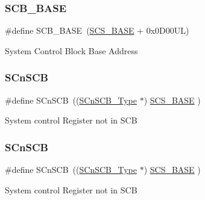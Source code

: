 \subsubsection{\texorpdfstring{S\+C\+B\+\_\+\+B\+A\+SE}{SCB\_BASE}\hspace{0.1cm}{\footnotesize\ttfamily [7/7]}}
{\footnotesize\ttfamily \#define S\+C\+B\+\_\+\+B\+A\+SE~(\hyperlink{group___c_m_s_i_s__core__base_ga3c14ed93192c8d9143322bbf77ebf770}{S\+C\+S\+\_\+\+B\+A\+SE} +  0x0\+D00\+U\+L)}

System Control Block Base Address \mbox{\label{group___c_m_s_i_s__core__base_ga9fe0cd2eef83a8adad94490d9ecca63f}} 
\subsubsection{\texorpdfstring{S\+Cn\+S\+CB}{SCnSCB}\hspace{0.1cm}{\footnotesize\ttfamily [1/5]}}
{\footnotesize\ttfamily \#define S\+Cn\+S\+CB~((\hyperlink{struct_s_cn_s_c_b___type}{S\+Cn\+S\+C\+B\+\_\+\+Type}    $\ast$)     \hyperlink{group___c_m_s_i_s__core__base_ga3c14ed93192c8d9143322bbf77ebf770}{S\+C\+S\+\_\+\+B\+A\+SE}      )}

System control Register not in S\+CB \mbox{\label{group___c_m_s_i_s__core__base_ga9fe0cd2eef83a8adad94490d9ecca63f}} 
\subsubsection{\texorpdfstring{S\+Cn\+S\+CB}{SCnSCB}\hspace{0.1cm}{\footnotesize\ttfamily [2/5]}}
{\footnotesize\ttfamily \#define S\+Cn\+S\+CB~((\hyperlink{struct_s_cn_s_c_b___type}{S\+Cn\+S\+C\+B\+\_\+\+Type}    $\ast$)     \hyperlink{group___c_m_s_i_s__core__base_ga3c14ed93192c8d9143322bbf77ebf770}{S\+C\+S\+\_\+\+B\+A\+SE}      )}

System control Register not in S\+CB \mbox{\label{group___c_m_s_i_s__core__base_ga9fe0cd2eef83a8adad94490d9ecca63f}} 
